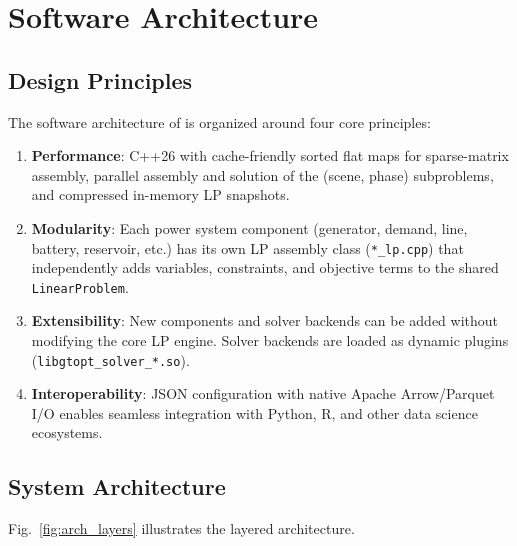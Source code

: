 
\section{Software Architecture}
\label{sec:architecture}

\subsection{Design Principles}

The software architecture of \gtopt{} is organized around four core
principles:

\begin{enumerate}
  \item \textbf{Performance}: C++26 with cache-friendly sorted flat maps
    for sparse-matrix assembly, parallel assembly and solution of the
    (scene, phase) subproblems, and compressed in-memory LP snapshots.
  \item \textbf{Modularity}: Each power system component (generator,
    demand, line, battery, reservoir, etc.) has its own LP assembly class
    (\texttt{*\_lp.cpp}) that independently adds variables, constraints,
    and objective terms to the shared \texttt{LinearProblem}.
  \item \textbf{Extensibility}: New components and solver backends can be
    added without modifying the core LP engine.  Solver backends are
    loaded as dynamic plugins (\texttt{libgtopt\_solver\_*.so}).
  \item \textbf{Interoperability}: JSON configuration with native Apache
    Arrow/Parquet I/O enables seamless integration with Python, R, and
    other data science ecosystems.
\end{enumerate}

\subsection{System Architecture}

Fig.~\ref{fig:arch_layers} illustrates the layered architecture.

